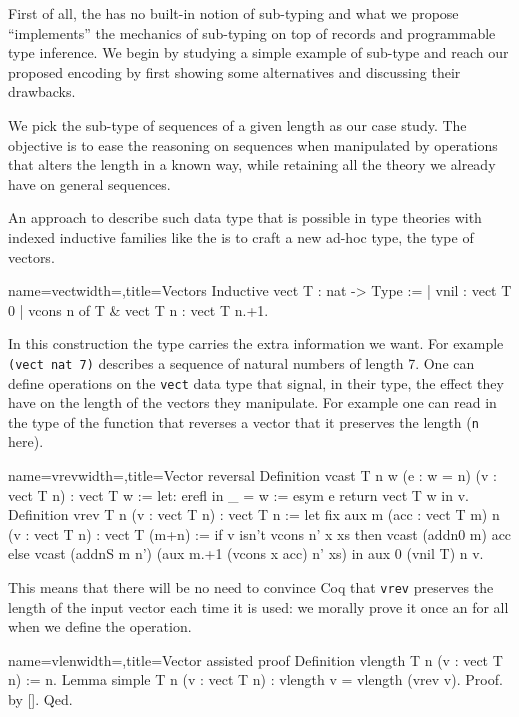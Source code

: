 First of all, the \mcbCIC{} has no built-in notion of sub-typing and
what we propose ``implements'' the mechanics of sub-typing on top
of records and programmable type inference.  We begin by studying a
simple example of sub-type and reach our proposed encoding by first
showing some alternatives and discussing their drawbacks.

We pick the sub-type of sequences of a given length as our case study.
The objective is to ease the reasoning on sequences when manipulated
by operations that alters the length in a known way, while retaining
all the theory we already have on general sequences.

An approach to describe such data type that is possible in type
theories with indexed inductive families like the \mcbCIC{} is to
craft a new ad-hoc type, the type of vectors.

\begin{coq}{name=vect}{width=\textwidth,title=Vectors}
Inductive vect T : nat -> Type :=
| vnil : vect T 0
| vcons n of T & vect T n : vect T n.+1.
\end{coq}

In this construction the type carries the extra information we want.
For example \lstinline/(vect nat 7)/ describes a sequence of natural
numbers of length 7.
One can define operations on the \lstinline/vect/ data type that
signal, in their type, the effect they have on the length of the
vectors they manipulate.  For example one can read in the type of the
function that reverses a vector that it preserves the length
(\lstinline/n/ here).

\begin{coq}{name=vrev}{width=\textwidth,title=Vector reversal}
Definition vcast {T n w} (e : w = n) (v : vect T n) : vect T w :=
  let: erefl in _ = w := esym e return vect T w in v.
  Definition vrev {T n} (v : vect T n) : vect T n :=
  let fix aux m (acc : vect T m) n (v : vect T n) : vect T (m+n) :=
    if v isn't vcons n' x xs then vcast (addn0 m) acc
    else vcast (addnS m n') (aux m.+1 (vcons x acc) n' xs) in
  aux 0 (vnil T) n v.
\end{coq}

This means that there will be no need to convince Coq that
\lstinline/vrev/ preserves the length of the input vector
each time it is used: we morally prove it once an for all
when we define the operation.

\begin{coq}{name=vlen}{width=\textwidth,title=Vector assisted proof}
Definition vlength {T n} (v : vect T n) := n.
Lemma simple T n (v : vect T n) : vlength v = vlength (vrev v).
Proof. by []. Qed.
\end{coq}


